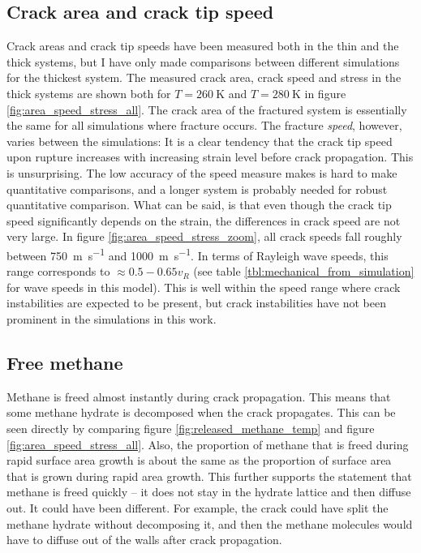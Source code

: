 \subsection{Crack area and crack tip speed}
Crack areas and crack tip speeds have been measured both in the thin and the thick systems, but I have only made comparisons between different simulations for the thickest system. The measured crack area, crack speed and stress in the thick systems are shown both for $T=\SI{260}{\kelvin}$ and $T=\SI{280}{\kelvin}$ in figure \ref{fig:area_speed_stress_all}. The crack area of the fractured system is essentially the same for all simulations where fracture occurs. The fracture \emph{speed}, however, varies between the simulations: It is a clear tendency that the crack tip speed upon rupture increases with increasing strain level before crack propagation. This is unsurprising. The low accuracy of the speed measure makes is hard to make quantitative comparisons, and a longer system is probably needed for robust quantitative comparison. What can be said, is that even though the crack tip speed significantly depends on the strain, the differences in crack speed are not very large. In figure \ref{fig:area_speed_stress_zoom}, all crack speeds fall roughly between \SI{750}{\meter\per\second} and \SI{1000}{\meter\per\second}. In terms of Rayleigh wave speeds, this range corresponds to $\approx 0.5 - 0.65 v_R$ (see table \ref{tbl:mechanical_from_simulation} for wave speeds in this model). This is well within the speed range where crack instabilities are expected to be present, but crack instabilities have not been prominent in the simulations in this work.

\subsection{Free methane}
Methane is freed almost instantly during crack propagation. This means that some methane hydrate is decomposed when the crack propagates. This can be seen directly by comparing figure \ref{fig:released_methane_temp} and figure \ref{fig:area_speed_stress_all}. Also, the proportion of methane that is freed during rapid surface area growth is about the same as the proportion of surface area that is grown during rapid area growth. This further supports the statement that methane is freed quickly -- it does not stay in the hydrate lattice and then diffuse out.
It could have been different. For example, the crack could have split the methane hydrate without decomposing it, and then the methane molecules would have to diffuse out of the walls after crack propagation. 

